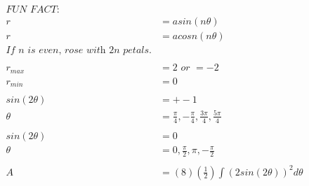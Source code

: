 \documentclass{article}
\begin{document}
\begin{enumerate}
\begin{enumerate}
\begin{align*}
            \textit{FUN FACT:} \\
            r&=asin(n\theta) \\
            r&=acosn(n\theta) \\
            \textit{If n is even, rose with 2n petals.} \\
            \\
            r_{max}&=2\textit{ or }=-2 \\
            r_{min}&=0 \\
            \\
            sin(2\theta)&=+-1\\
            \theta&=\frac{\pi}{4},-\frac{\pi}{4},\frac{3\pi}{4},\frac{5\pi}{4} \\
            \\
            sin(2\theta)&=0\\
            \theta&=0,\frac{\pi}{2},{\pi},-\frac{\pi}{2} \\
            \\
            A&=(8)(\frac{1}{2})\int(2sin(2\theta))^2d\theta \\
        \end{align*}
    \end{enumerate}
\end{enumerate}
\end{document}
